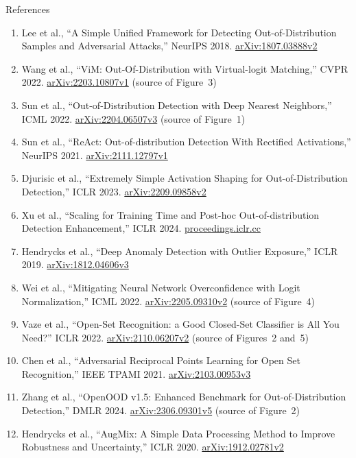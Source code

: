 \begin{frame}[allowframebreaks]{References}
\begin{enumerate}
    \item Lee et al., ``A Simple Unified Framework for Detecting Out-of-Distribution Samples and Adversarial Attacks,'' NeurIPS 2018. \href{https://arxiv.org/abs/1807.03888v2}{arXiv:1807.03888v2}
    \item Wang et al., ``ViM: Out-Of-Distribution with Virtual-logit Matching,'' CVPR 2022. \href{https://arxiv.org/abs/2203.10807v1}{arXiv:2203.10807v1} (source of Figure~3)
    \item Sun et al., ``Out-of-Distribution Detection with Deep Nearest Neighbors,'' ICML 2022. \href{https://arxiv.org/abs/2204.06507v3}{arXiv:2204.06507v3} (source of Figure~1)
    \item Sun et al., ``ReAct: Out-of-distribution Detection With Rectified Activations,'' NeurIPS 2021. \href{https://arxiv.org/abs/2111.12797v1}{arXiv:2111.12797v1}
    \item Djurisic et al., ``Extremely Simple Activation Shaping for Out-of-Distribution Detection,'' ICLR 2023. \href{https://arxiv.org/abs/2209.09858v2}{arXiv:2209.09858v2}
    \item Xu et al., ``Scaling for Training Time and Post-hoc Out-of-distribution Detection Enhancement,'' ICLR 2024. \href{https://proceedings.iclr.cc/paper_files/paper/2024/hash/46d943bc6a15a57c923829efc0db7c7a-Abstract-Conference.html}{proceedings.iclr.cc}
    \item Hendrycks et al., ``Deep Anomaly Detection with Outlier Exposure,'' ICLR 2019. \href{https://arxiv.org/abs/1812.04606v3}{arXiv:1812.04606v3}
    \item Wei et al., ``Mitigating Neural Network Overconfidence with Logit Normalization,'' ICML 2022. \href{https://arxiv.org/abs/2205.09310v2}{arXiv:2205.09310v2} (source of Figure~4)
    \item Vaze et al., ``Open-Set Recognition: a Good Closed-Set Classifier is All You Need?'' ICLR 2022. \href{https://arxiv.org/abs/2110.06207v2}{arXiv:2110.06207v2} (source of Figures~2 and~5)
    \item Chen et al., ``Adversarial Reciprocal Points Learning for Open Set Recognition,'' IEEE TPAMI 2021. \href{https://arxiv.org/abs/2103.00953v3}{arXiv:2103.00953v3}
    \item Zhang et al., ``OpenOOD v1.5: Enhanced Benchmark for Out-of-Distribution Detection,'' DMLR 2024. \href{https://arxiv.org/abs/2306.09301v5}{arXiv:2306.09301v5} (source of Figure~2)
    \item Hendrycks et al., ``AugMix: A Simple Data Processing Method to Improve Robustness and Uncertainty,'' ICLR 2020. \href{https://arxiv.org/abs/1912.02781v2}{arXiv:1912.02781v2}

\end{enumerate}
\end{frame}
